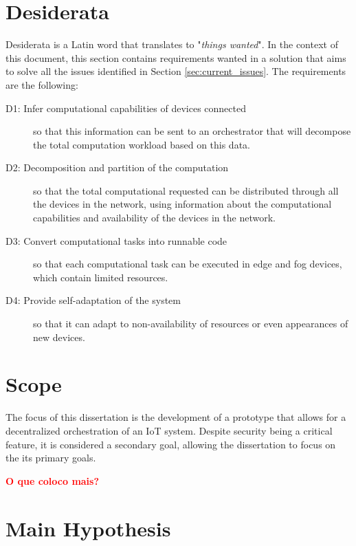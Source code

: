 \section{Desiderata}\label{sec:disiderata}

Desiderata is a Latin word that translates to "\emph{things wanted}". In the context of this document, this section contains requirements wanted in a solution that aims to solve all the issues identified in Section \ref{sec:current_issues}. The requirements are the following:

\begin{description}
    \item [D1: Infer computational capabilities of devices connected] so that this information can be sent to an orchestrator that will decompose the total computation workload based on this data.
    \item [D2: Decomposition and partition of the computation] so that the total computational requested can be distributed through all the devices in the network, using information about the computational capabilities and availability of the devices in the network.
    \item [D3: Convert computational tasks into runnable code] so that each computational task can be executed in edge and fog devices, which contain limited resources.
    \item [D4: Provide self-adaptation of the system] so that it can adapt to non-availability of resources or even appearances of new devices.
\end{description}

\section{Scope}\label{sec:scope}

The focus of this dissertation is the development of a prototype that allows for a decentralized orchestration of an IoT system. Despite security being a critical feature, it is considered a secondary goal, allowing the dissertation to focus on the its primary goals.

\textcolor{red}{\textbf{O que coloco mais?}}


\section{Main Hypothesis}\label{sec:stat_research_questions}

